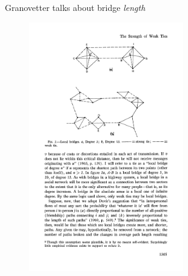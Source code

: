 \documentclass[aspectratio=169]{beamer}
\begin{document}
\begin{frame}

Granovetter talks about bridge \emph{length}

\begin{figure}
\includegraphics[width=0.6\textwidth]{figures/granovetter_strength_1973_fig2}
\end{figure}


\end{frame}
\end{document}
